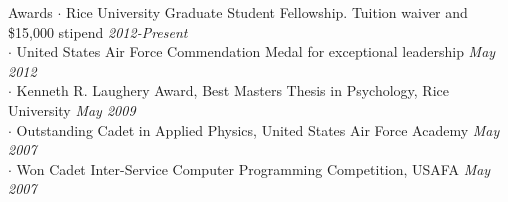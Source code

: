 
\begin{rSection}{Awards}
  $\cdot$ Rice University Graduate Student Fellowship. Tuition waiver and \$15,000 stipend
  \hfill {\em 2012-Present} \\
  $\cdot$ United States Air Force Commendation Medal for exceptional leadership 
  \hfill {\em May 2012} \\
  $\cdot$ Kenneth R. Laughery Award, Best Masters Thesis in Psychology, Rice University
  \hfill {\em May 2009} \\
  $\cdot$ Outstanding Cadet in Applied Physics, United States Air Force Academy
  \hfill {\em May 2007} \\
  $\cdot$ Won Cadet Inter-Service Computer Programming Competition, USAFA
  \hfill {\em May 2007}
\end{rSection}
